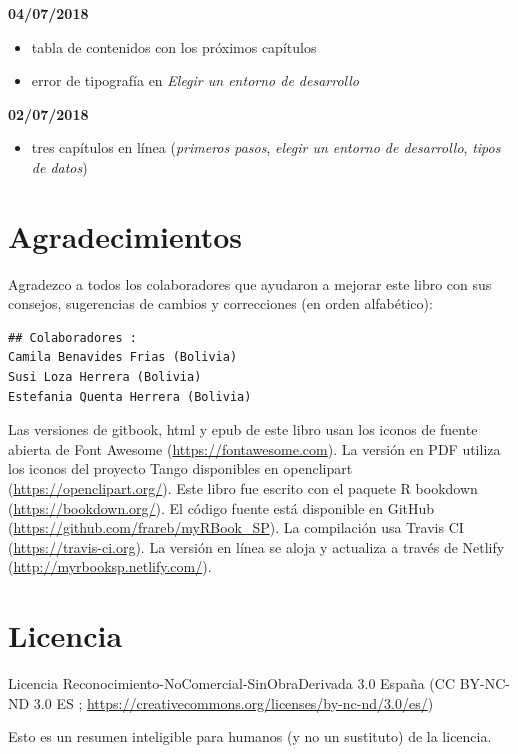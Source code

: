 \documentclass[]{book}
\providecommand{\tightlist}{%
  \setlength{\itemsep}{0pt}\setlength{\parskip}{0pt}}
\begin{document}
\textbf{04/07/2018}

\begin{itemize}
\tightlist
\item
  tabla de contenidos con los próximos capítulos
\item
  error de tipografía en \emph{Elegir un entorno de desarrollo}
\end{itemize}

\textbf{02/07/2018}

\begin{itemize}
\tightlist
\item
  tres capítulos en línea (\emph{primeros pasos}, \emph{elegir un
  entorno de desarrollo}, \emph{tipos de datos})
\end{itemize}

\chapter{Agradecimientos}\label{remerciements}

Agradezco a todos los colaboradores que ayudaron a mejorar este libro
con sus consejos, sugerencias de cambios y correcciones (en orden
alfabético):

\begin{verbatim}
## Colaboradores :
Camila Benavides Frias (Bolivia)
Susi Loza Herrera (Bolivia)
Estefania Quenta Herrera (Bolivia)
\end{verbatim}

Las versiones de gitbook, html y epub de este libro usan los iconos de
fuente abierta de Font Awesome (\url{https://fontawesome.com}). La
versión en PDF utiliza los iconos del proyecto Tango disponibles en
openclipart (\url{https://openclipart.org/}). Este libro fue escrito con
el paquete R bookdown (\url{https://bookdown.org/}). El código fuente
está disponible en GitHub (\url{https://github.com/frareb/myRBook_SP}).
La compilación usa Travis CI (\url{https://travis-ci.org}). La versión
en línea se aloja y actualiza a través de Netlify
(\url{http://myrbooksp.netlify.com/}).

\chapter{Licencia}\label{licence}

Licencia Reconocimiento-NoComercial-SinObraDerivada 3.0 España (CC
BY-NC-ND 3.0 ES ;
\url{https://creativecommons.org/licenses/by-nc-nd/3.0/es/})

Esto es un resumen inteligible para humanos (y no un sustituto) de la
licencia.
\end{document}
